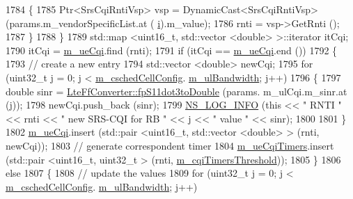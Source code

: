 \begin{DoxyCode}
1784               \{
1785                 Ptr<SrsCqiRntiVsp> vsp = DynamicCast<SrsCqiRntiVsp> (params.m\_vendorSpecificList.at (
      \hyperlink{bernuolliDistribution_8m_a6f6ccfcf58b31cb6412107d9d5281426}{i}).m\_value);
1786                 rnti = vsp->GetRnti ();
1787               \}
1788           \}
1789         std::map <uint16\_t, std::vector <double> >::iterator itCqi;
1790         itCqi = \hyperlink{classns3_1_1RrFfMacScheduler_aa19c6b6aafe91b47dbd96017fc913b40}{m\_ueCqi}.find (rnti);
1791         \textcolor{keywordflow}{if} (itCqi == \hyperlink{classns3_1_1RrFfMacScheduler_aa19c6b6aafe91b47dbd96017fc913b40}{m\_ueCqi}.end ())
1792           \{
1793             \textcolor{comment}{// create a new entry}
1794             std::vector <double> newCqi;
1795             \textcolor{keywordflow}{for} (uint32\_t j = 0; j < \hyperlink{classns3_1_1RrFfMacScheduler_a809c6237863709f97fc450b1a2ba60d4}{m\_cschedCellConfig}.
      \hyperlink{structns3_1_1FfMacCschedSapProvider_1_1CschedCellConfigReqParameters_a5ab5b102878e6e7e7727a14af4a64d2f}{m\_ulBandwidth}; j++)
1796               \{
1797                 \textcolor{keywordtype}{double} sinr = \hyperlink{classns3_1_1LteFfConverter_aa5d8c2a8f988dbd63da91818c18666eb}{LteFfConverter::fpS11dot3toDouble} (params.
      m\_ulCqi.m\_sinr.at (j));
1798                 newCqi.push\_back (sinr);
1799                 \hyperlink{group__logging_gafbd73ee2cf9f26b319f49086d8e860fb}{NS\_LOG\_INFO} (\textcolor{keyword}{this} << \textcolor{stringliteral}{" RNTI "} << rnti << \textcolor{stringliteral}{" new SRS-CQI for RB  "} << j << \textcolor{stringliteral}{" value
       "} << sinr);
1800 
1801               \}
1802             \hyperlink{classns3_1_1RrFfMacScheduler_aa19c6b6aafe91b47dbd96017fc913b40}{m\_ueCqi}.insert (std::pair <uint16\_t, std::vector <double> > (rnti, newCqi));
1803             \textcolor{comment}{// generate correspondent timer}
1804             \hyperlink{classns3_1_1RrFfMacScheduler_a348744ac7d5fc0c7d00d6df7efff37a4}{m\_ueCqiTimers}.insert (std::pair <uint16\_t, uint32\_t > (rnti, 
      \hyperlink{classns3_1_1RrFfMacScheduler_a51ae1963d7d95e89917af4c603f08a91}{m\_cqiTimersThreshold}));
1805           \}
1806         \textcolor{keywordflow}{else}
1807           \{
1808             \textcolor{comment}{// update the values}
1809             \textcolor{keywordflow}{for} (uint32\_t j = 0; j < \hyperlink{classns3_1_1RrFfMacScheduler_a809c6237863709f97fc450b1a2ba60d4}{m\_cschedCellConfig}.
      \hyperlink{structns3_1_1FfMacCschedSapProvider_1_1CschedCellConfigReqParameters_a5ab5b102878e6e7e7727a14af4a64d2f}{m\_ulBandwidth}; j++)

\end{DoxyCode}
